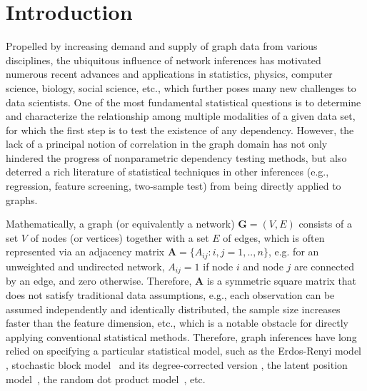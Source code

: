 \documentclass[11pt]{article}
\theoremstyle{definition}
\begin{document}
\section{Introduction}
\label{sec:intro}
	\vspace*{-0.2cm}
Propelled by increasing demand and supply of graph data from various disciplines, the ubiquitous influence of network inferences has motivated numerous recent advances and applications in statistics, physics, computer science, biology, social science, etc., which further poses many new challenges to data scientists. One of the most fundamental statistical questions is to determine and characterize the relationship among multiple modalities of a given data set, for which the first step is to test the existence of any dependency. However, the lack of a principal notion of correlation in the graph domain has not only hindered the progress of nonparametric dependency testing methods, but also deterred a rich literature of statistical techniques in other inferences (e.g., regression, feature screening, two-sample test) from being directly applied to graphs.
 
Mathematically, a graph (or equivalently a network) $\mathbf{G}=(V,E)$ consists of a set $V$ of nodes (or vertices) together with a set $E$ of edges, which is often represented via an adjacency matrix $\mathbf{A} = \{A_{ij} : i,j= 1,..,n \}$, e.g. for an unweighted and undirected network, $A_{ij} = 1$ if node $i$ and node $j$ are connected by an edge, and zero otherwise. Therefore, $\mathbf{A}$ is a symmetric square matrix that does not satisfy traditional data assumptions, e.g., each observation can be assumed independently and identically distributed, the sample size increases faster than the feature dimension, etc., which is a notable obstacle for directly applying conventional statistical methods. Therefore, graph inferences have long relied on specifying a particular statistical model, such as the Erdos-Renyi model \cite{erdosrenyi1959,Gilbert1959}, stochastic block model~\cite{HollandEtAl1983, rohe2011spectral,SussmanEtAl2012,Lei2015} and its degree-corrected version \cite{karrer2011stochastic, ZhaoLevinaZhu2012}, the latent position model~\cite{TangSussmanPriebe2013,fosdick2015testing}, the random dot product model~\cite{YoungScheinerman2007, sussman2014consistent}, etc. 
\end{document}
